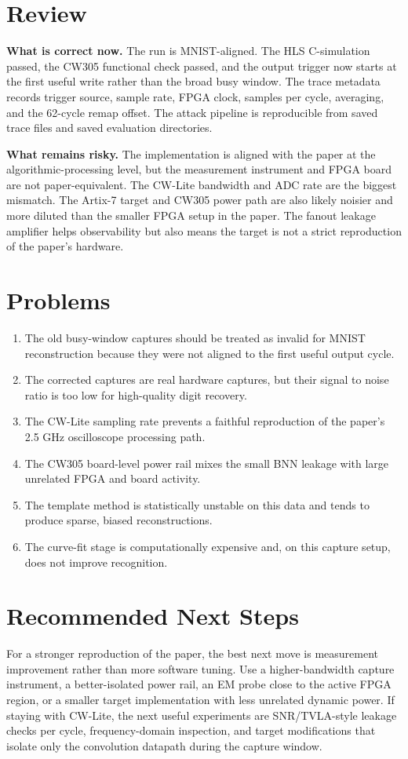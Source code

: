 \documentclass[11pt]{article}
\begin{document}
\section{Review}
\textbf{What is correct now.}
The run is MNIST-aligned.  The HLS C-simulation passed, the CW305 functional
check passed, and the output trigger now starts at the first useful write rather
than the broad busy window.  The trace metadata records trigger source, sample
rate, FPGA clock, samples per cycle, averaging, and the 62-cycle remap offset.
The attack pipeline is reproducible from saved trace files and saved evaluation
directories.

\textbf{What remains risky.}
The implementation is aligned with the paper at the algorithmic-processing
level, but the measurement instrument and FPGA board are not paper-equivalent.
The CW-Lite bandwidth and ADC rate are the biggest mismatch.  The Artix-7 target
and CW305 power path are also likely noisier and more diluted than the smaller
FPGA setup in the paper.  The fanout leakage amplifier helps observability but
also means the target is not a strict reproduction of the paper's hardware.

\section{Problems}
\begin{enumerate}
  \item The old busy-window captures should be treated as invalid for MNIST
  reconstruction because they were not aligned to the first useful output cycle.
  \item The corrected captures are real hardware captures, but their signal to
  noise ratio is too low for high-quality digit recovery.
  \item The CW-Lite sampling rate prevents a faithful reproduction of the
  paper's 2.5 GHz oscilloscope processing path.
  \item The CW305 board-level power rail mixes the small BNN leakage with large
  unrelated FPGA and board activity.
  \item The template method is statistically unstable on this data and tends to
  produce sparse, biased reconstructions.
  \item The curve-fit stage is computationally expensive and, on this capture
  setup, does not improve recognition.
\end{enumerate}

\section{Recommended Next Steps}
For a stronger reproduction of the paper, the best next move is measurement
improvement rather than more software tuning.  Use a higher-bandwidth capture
instrument, a better-isolated power rail, an EM probe close to the active FPGA
region, or a smaller target implementation with less unrelated dynamic power.
If staying with CW-Lite, the next useful experiments are SNR/TVLA-style leakage
checks per cycle, frequency-domain inspection, and target modifications that
isolate only the convolution datapath during the capture window.
\end{document}

